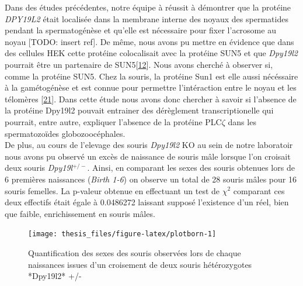 \documentclass[12pt,twoside]{reedthesis}
\theoremstyle{definition}
\theoremstyle{definition}
\theoremstyle{remark}
\begin{document}
  Dans des études précédentes, notre équipe à réussit à démontrer que la
  protéine \emph{DPY19L2} était localisée dans la membrane interne des
  noyaux des spermatides pendant la spermatogénèse et qu'elle est
  nécessaire pour fixer l'acrosome au noyau {[}TODO: insert ref{]}. De
  même, nous avons pu mettre en évidence que dans des cellules HEK cette
  protéine colocalisait avec la protéine SUN5 et que \emph{Dpy19l2}
  pourrait être un partenaire de
  SUN5{[}\protect\hyperlink{ref-Pierre2012}{12}{]}. Nous avons cherché à
  observer si, comme la protéine SUN5. Chez la souris, la protéine Sun1
  est elle aussi nécéssaire à la gamétogénèse et est connue pour permettre
  l'intéraction entre le noyau et les télomères
  {[}\protect\hyperlink{ref-Ding2007}{21}{]}. Dans cette étude nous avons
  donc chercher à savoir si l'absence de la protéine Dpy19l2 pouvait
  entrainer des dérèglement transcriptionelle qui pourrait, entre autre,
  expliquer l'absence de la protéine PLC\(\zeta\) dans les spermatozoïdes
  globozoocéphales.\\
  De plus, au cours de l'elevage des souris \emph{Dpy19l2} KO au sein de
  notre laboratoir nous avons pu observé un excès de naissance de souris
  mâle lorsque l'on croisait deux souris \emph{Dpy19l}\(^{+/-}\). Ainsi,
  en comparant les sexes des souris obtenues lors de 6 premières
  naissances (\emph{Birth 1-6}) on observe un total de 28 souris mâles
  pour 16 souris femelles. La p-valeur obtenue en effectuant un test de
  \(\chi^2\) comparant ces deux effectifs était égale à 0.0486272 laissant
  supposé l'existence d'un réel, bien que faible, enrichissement en souris
  mâles.
  
  \begin{figure}
  
  {\centering \texttt{[image: thesis\_files/figure-latex/plotborn-1]} 
  
  }
  
  \caption[Quantification des sexes des souris observées lors de chaque naissances issues d'un croisement de deux souris hétérozygotes *Dpy19l2* +/-]{Quantification des sexes des souris observées lors de chaque naissances issues d'un croisement de deux souris hétérozygotes *Dpy19l2* +/-}\label{fig:plotborn}
  \end{figure}
  
  \newpage
  
\end{document}
